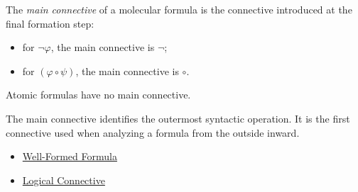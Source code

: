 \begin{tcolorbox}[colback=propbox, colframe=propborder, arc=2pt,
  left=6pt, right=6pt, top=4pt, bottom=4pt,
  title={\small\textbf{Definition (Main Connective)}},
  fonttitle=\small\bfseries]
\label{def:main-connective}
The \emph{main connective} of a molecular formula is the connective introduced
at the final formation step:
\begin{itemize}
  \item for $\neg\varphi$, the main connective is $\neg$;
  \item for $(\varphi\circ\psi)$, the main connective is $\circ$.
\end{itemize}
Atomic formulas have no main connective.
\end{tcolorbox}

\begin{remark*}[Interpretation]
The main connective identifies the outermost syntactic operation. It is the
first connective used when analyzing a formula from the outside inward.
\end{remark*}

\begin{dependencies}
\begin{itemize}
  \item \hyperref[def:well-formed-formula]{Well-Formed Formula}
  \item \hyperref[def:logical-connective]{Logical Connective}
\end{itemize}
\end{dependencies}
